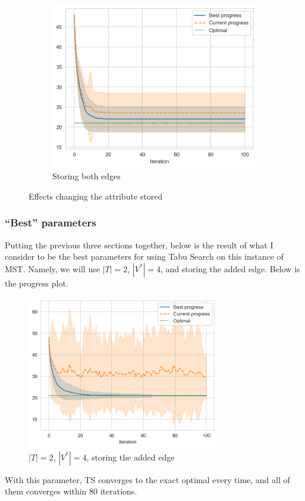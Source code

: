 \begin{figure}[ht]
\begin{subfigure}{0.45\textwidth}
        \centering
        \includegraphics[width=\textwidth]{../images/p1/both34s.png}
        \caption{Storing both edges}
    \end{subfigure}

    \caption{Effects changing the attribute stored}
    \label{fig:p1-change-attr}
\end{figure}

\subsubsection{``Best'' parameters}

Putting the previous three sections together, below is the result of what I consider to be the best parameters for using Tabu Search on this instance of MST. Namely, we will use \(|T| = 2\), \(|V^*| = 4\), and storing the added edge. Below is the progress plot.

\begin{figure}[ht]
    \centering
    \includegraphics[width=0.75\textwidth]{../images/p1/best.png}
    \caption{\(|T| = 2\), \(|V^*| = 4\), storing the added edge}
\end{figure}

With this parameter, TS converges to the exact optimal every time, and all of them converges within 80 iterations.
